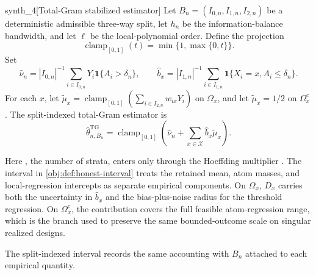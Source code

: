 \begin{definitionv}{synth_4}[Total-Gram stabilized estimator]
Let \(B_n=(I_{0,n},I_{1,n},I_{2,n})\) be a deterministic admissible three-way split, let \(h_n\) be the information-balance bandwidth, and let \(\ell\) be the local-polynomial order. Define the projection
\[
  \operatorname{clamp}_{[0,1]}(t)=\min\{1,\max\{0,t\}\}.
\]
Set
\[
  \widehat\nu_n=|I_{0,n}|^{-1}\sum_{i\in I_{0,n}}Y_i\mathbf 1\{A_i>\delta_n\},\qquad
  \widehat b_x=|I_{1,n}|^{-1}\sum_{i\in I_{1,n}}\mathbf 1\{X_i=x,A_i\le\delta_n\}.
\]
For each \(x\), let \(\widetilde\mu_x=\operatorname{clamp}_{[0,1]}(\sum_{i\in I_{2,n}}w_{ix}Y_i)\) on \(\Omega_x\), and let \(\widetilde\mu_x=1/2\) on \(\Omega_x^c\). The split-indexed total-Gram estimator is
\[
  \widehat\theta_{n,B_n}^{\mathrm{TG}}
  =\operatorname{clamp}_{[0,1]}\!\left(\widehat\nu_n+\sum_{x\in\mathcal X}\widehat b_x\widetilde\mu_x\right).
\]
\end{definitionv}

Here , the number of strata, enters only through the Hoeffding multiplier . The interval  in \cref{obj:def:honest-interval} treats the retained mean, atom masses, and local-regression intercepts as separate empirical components. On \(\Omega_x\), \(D_x\) carries both the uncertainty in \(\widehat b_x\) and the bias-plus-noise radius for the threshold regression. On \(\Omega_x^c\), the contribution covers the full feasible atom-regression range, which is the branch used to preserve the same bounded-outcome scale on singular realized designs.

The split-indexed interval records the same accounting with \(B_n\) attached to each empirical quantity.

